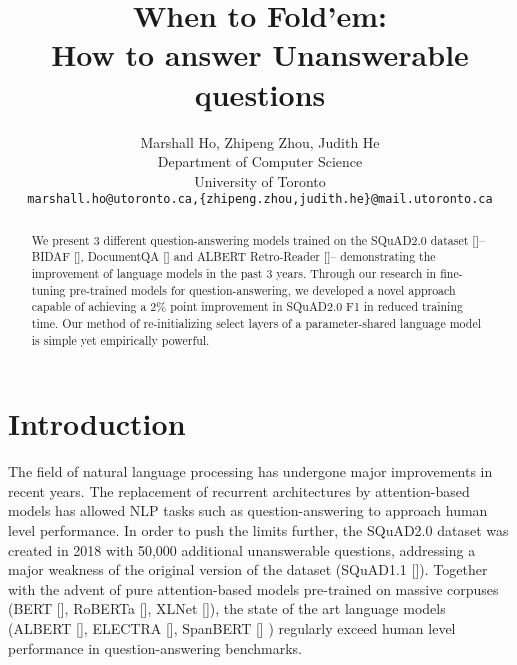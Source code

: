 \documentclass{article}
\title{When to Fold'em: \\How to answer Unanswerable questions}
\author{%
  Marshall Ho, Zhipeng Zhou, Judith He\\
  Department of Computer Science\\
  University of Toronto\\
  \texttt{marshall.ho@utoronto.ca,\{zhipeng.zhou,judith.he\}@mail.utoronto.ca} \\
}
\begin{document}
\maketitle

\begin{abstract}

    We present 3 different question-answering models trained on the SQuAD2.0 dataset []-- BIDAF [], DocumentQA [] and ALBERT Retro-Reader []-- demonstrating the improvement of language models in the past 3 years.   Through our research in fine-tuning pre-trained models for question-answering, we developed a novel approach capable of achieving a 2\% point improvement in SQuAD2.0 F1 in reduced training time.  Our method of re-initializing select layers of a parameter-shared language model is simple yet empirically powerful.

\end{abstract}

\section{Introduction}
    The field of natural language processing has undergone major improvements in recent years.  The replacement of recurrent architectures by attention-based models has allowed NLP tasks such as question-answering to approach human level performance.  In order to push the limits further, the SQuAD2.0 dataset was created in 2018 with 50,000 additional unanswerable questions, addressing a major weakness of the original version of the dataset (SQuAD1.1 []).  Together with the advent of pure attention-based models pre-trained on massive corpuses (BERT [], RoBERTa [], XLNet []), the state of the art language models (ALBERT [], ELECTRA [], SpanBERT [] ) regularly exceed human level performance in question-answering benchmarks.


\end{document}
